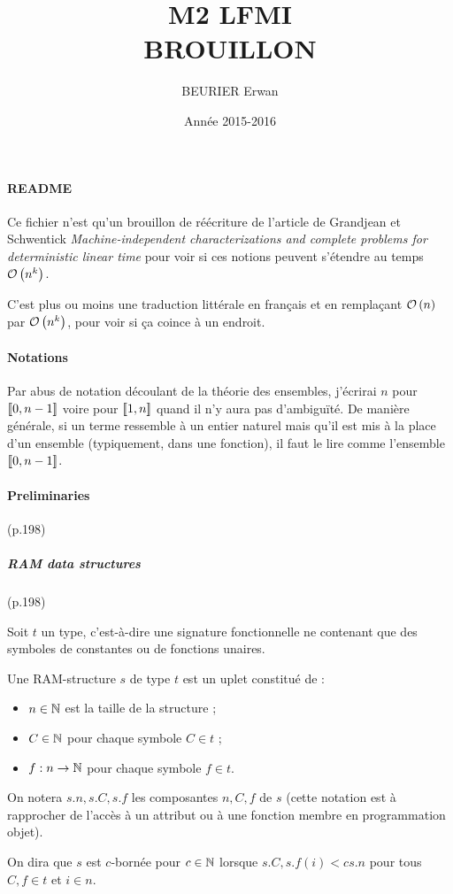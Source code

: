 \documentclass{article}
\author{BEURIER Erwan}
\title{M2 LFMI \\ BROUILLON }
\date{Année 2015-2016}
\begin{document}
	
	
	\paragraph{README}
	
	
	Ce fichier n'est qu'un brouillon de réécriture de l'article de Grandjean et Schwentick \emph{Machine-independent characterizations and complete problems for deterministic linear time} pour voir si ces notions peuvent s'étendre au temps $\mathcal{O}\left( n^k \right)$.
	
	C'est plus ou moins une traduction littérale en français et en remplaçant $\mathcal{O}\left( n \right)$ par $\mathcal{O}\left( n^k \right)$, pour voir si ça coince à un endroit.
	
	
	\paragraph{Notations}
	
	
	Par abus de notation découlant de la théorie des ensembles, j'écrirai $n$ pour $\left[\!\left[ 0 , n-1 \right]\!\right]$ voire pour $\left[\!\left[ 1 , n \right]\!\right]$ quand il n'y aura pas d'ambiguïté. De manière générale, si un terme ressemble à un entier naturel mais qu'il est mis à la place d'un ensemble (typiquement, dans une fonction), il faut le lire comme l'ensemble $\left[\!\left[ 0 , n-1 \right]\!\right]$.
	
	\pagebreak
	
	\paragraph{Preliminaries} (p.198)
	
	
		\subparagraph{RAM data structures} (p.198)
	

		\begin{definition}
			Soit $t$ un type, c'est-à-dire une signature fonctionnelle ne contenant que des symboles de constantes ou de fonctions unaires.
			
			Une RAM-structure $s$ de type $t$ est un uplet constitué de :
			\begin{itemize}
				\setlength{\itemsep}{-1mm}
				\item 	$n \in \mathbb{N}$ est la taille de la structure ;
				\item 	$C \in \mathbb{N}$ pour chaque symbole $C \in t$ ;
				\item 	$f : n \to \mathbb{N}$ pour chaque symbole $f \in t$.
			\end{itemize}
			
			On notera $s.n, s.C, s.f$ les composantes $n, C, f$ de $s$ (cette notation est à rapprocher de l'accès à un attribut ou à une fonction membre en programmation objet).
			
			On dira que $s$ est $c$-bornée pour $c\in\mathbb{N}$ lorsque $s.C, s.f(i) < c s.n$ pour tous $C, f \in t$ et $i \in n$.
		\end{definition}
	
\end{document}
